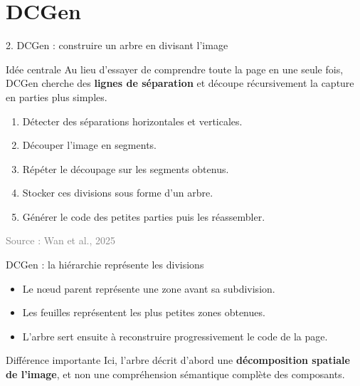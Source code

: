 \documentclass[aspectratio=169,11pt]{beamer}
\newcommand{\source}[1]{\scriptsize\textcolor{gray}{Source : #1}}
\begin{document}
\section{DCGen}

\begin{frame}{2. DCGen : construire un arbre en divisant l'image}
\begin{block}{Idée centrale}
Au lieu d'essayer de comprendre toute la page en une seule fois,
DCGen cherche des \textbf{lignes de séparation} et découpe récursivement
la capture en parties plus simples.
\end{block}

\begin{enumerate}
  \item Détecter des séparations horizontales et verticales.
  \item Découper l'image en segments.
  \item Répéter le découpage sur les segments obtenus.
  \item Stocker ces divisions sous forme d'un arbre.
  \item Générer le code des petites parties puis les réassembler.
\end{enumerate}

\source{Wan et al., 2025}
\end{frame}

\begin{frame}{DCGen : la hiérarchie représente les divisions}
\centering
{}

\vspace{0.35cm}
\begin{itemize}
  \item Le nœud parent représente une zone avant sa subdivision.
  \item Les feuilles représentent les plus petites zones obtenues.
  \item L'arbre sert ensuite à reconstruire progressivement le code de la page.
\end{itemize}

\begin{alertblock}{Différence importante}
Ici, l'arbre décrit d'abord une \textbf{décomposition spatiale de l'image},
et non une compréhension sémantique complète des composants.
\end{alertblock}
\end{frame}
\end{document}
